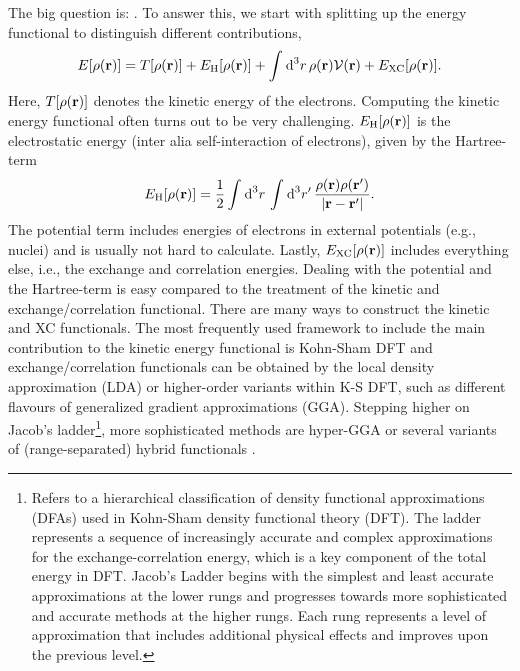 \documentclass[\main/main.tex]{subfiles}
\begin{document}
The big question is: . To answer this, we start with splitting up the energy functional to distinguish different contributions,
\begin{align}
	E[\rho(\textbf{r})]=T[\rho(\textbf{r})]+E_{\text{H}}[\rho(\textbf{r})]+\int_{}^{}\text{d}^3r\,\rho(\textbf{r})\mathcal{V}(\textbf{r})+E_{\text{XC}}[\rho(\textbf{r})].
\end{align}
Here, $T[\rho(\textbf{r})]$ denotes the kinetic energy of the electrons. Computing the kinetic energy functional often turns out to be very challenging. $E_{\text{H}}[\rho(\textbf{r})]$ is the electrostatic energy (inter alia self-interaction of electrons), given by the Hartree-term
\begin{align}
	E_{\text{H}}[\rho(\textbf{r})]=\frac 12\int_{}^{}\text{d}^3r\,\int_{}^{}\text{d}^3r'\,\frac{\rho(\textbf{r})\rho(\textbf{r}')}{|\textbf{r}-\textbf{r}'|}.
\end{align}
The potential term includes energies of electrons in external potentials (e.g., nuclei) and is usually not hard to calculate. Lastly, $E_{\text{XC}}[\rho(\textbf{r})]$ includes everything else, i.e., the exchange and correlation energies. Dealing with the potential and the Hartree-term is easy compared to the treatment of the kinetic and exchange/correlation functional. There are many ways to construct the kinetic and XC functionals. The most frequently used framework to include the main contribution to the kinetic energy functional is Kohn-Sham DFT and exchange/correlation functionals can be obtained by the local density approximation (LDA) or higher-order variants within K-S DFT, such as different flavours of generalized gradient approximations (GGA). Stepping higher on Jacob's ladder\footnote{Refers to a hierarchical classification of density functional approximations (DFAs) used in Kohn-Sham density functional theory (DFT). The ladder represents a sequence of increasingly accurate and complex approximations for the exchange-correlation energy, which is a key component of the total energy in DFT. Jacob's Ladder begins with the simplest and least accurate approximations at the lower rungs and progresses towards more sophisticated and accurate methods at the higher rungs. Each rung represents a level of approximation that includes additional physical effects and improves upon the previous level.}, more sophisticated methods are hyper-GGA or several variants of (range-separated) hybrid functionals \cite{Perdew2001}.
\end{document}
